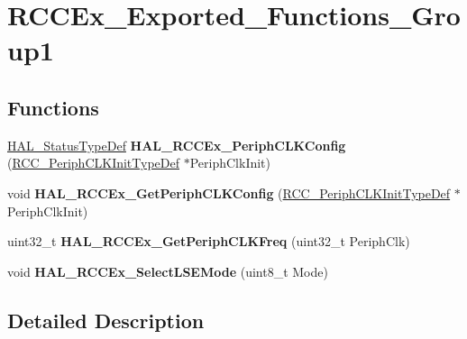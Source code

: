 \hypertarget{group___r_c_c_ex___exported___functions___group1}{}\section{R\+C\+C\+Ex\+\_\+\+Exported\+\_\+\+Functions\+\_\+\+Group1}
\label{group___r_c_c_ex___exported___functions___group1}
\subsection*{Functions}
\begin{DoxyCompactItemize}
\item 
\hyperlink{stm32f4xx__hal__def_8h_a63c0679d1cb8b8c684fbb0632743478f}{H\+A\+L\+\_\+\+Status\+Type\+Def} {\bfseries H\+A\+L\+\_\+\+R\+C\+C\+Ex\+\_\+\+Periph\+C\+L\+K\+Config} (\hyperlink{struct_r_c_c___periph_c_l_k_init_type_def}{R\+C\+C\+\_\+\+Periph\+C\+L\+K\+Init\+Type\+Def} $\ast$Periph\+Clk\+Init)\hypertarget{group___r_c_c_ex___exported___functions___group1_ga0c0f61a1e2f47cc81bc43d83ba3e0d95}{}\label{group___r_c_c_ex___exported___functions___group1_ga0c0f61a1e2f47cc81bc43d83ba3e0d95}

\item 
void {\bfseries H\+A\+L\+\_\+\+R\+C\+C\+Ex\+\_\+\+Get\+Periph\+C\+L\+K\+Config} (\hyperlink{struct_r_c_c___periph_c_l_k_init_type_def}{R\+C\+C\+\_\+\+Periph\+C\+L\+K\+Init\+Type\+Def} $\ast$Periph\+Clk\+Init)\hypertarget{group___r_c_c_ex___exported___functions___group1_ga754fc5136c63ad52b7c459aafc8a3927}{}\label{group___r_c_c_ex___exported___functions___group1_ga754fc5136c63ad52b7c459aafc8a3927}

\item 
uint32\+\_\+t {\bfseries H\+A\+L\+\_\+\+R\+C\+C\+Ex\+\_\+\+Get\+Periph\+C\+L\+K\+Freq} (uint32\+\_\+t Periph\+Clk)\hypertarget{group___r_c_c_ex___exported___functions___group1_ga14acaeb88163a6bb0839470b753ba1bd}{}\label{group___r_c_c_ex___exported___functions___group1_ga14acaeb88163a6bb0839470b753ba1bd}

\item 
void {\bfseries H\+A\+L\+\_\+\+R\+C\+C\+Ex\+\_\+\+Select\+L\+S\+E\+Mode} (uint8\+\_\+t Mode)\hypertarget{group___r_c_c_ex___exported___functions___group1_ga1e94ec1c8e3ebb0279d0d3bb744fdfe4}{}\label{group___r_c_c_ex___exported___functions___group1_ga1e94ec1c8e3ebb0279d0d3bb744fdfe4}

\end{DoxyCompactItemize}


\subsection{Detailed Description}
